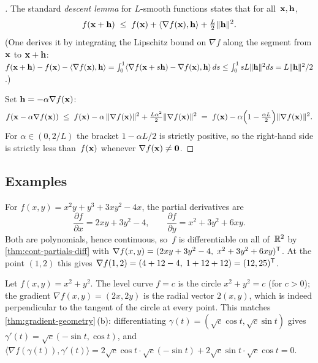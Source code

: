 \begin{proof}[]
The standard \emph{descent lemma} for $L$-smooth functions states
that for all~$\mathbf{x}, \mathbf{h}$,
\[
  f(\mathbf{x} + \mathbf{h}) \;\le\; f(\mathbf{x}) + \langle \nabla f(\mathbf{x}), \mathbf{h} \rangle + \tfrac{L}{2}\|\mathbf{h}\|^2.
\]
(One derives it by integrating the Lipschitz bound on $\nabla f$
along the segment from $\mathbf{x}$ to $\mathbf{x} + \mathbf{h}$:
$f(\mathbf{x} + \mathbf{h}) - f(\mathbf{x}) - \langle \nabla f(\mathbf{x}), \mathbf{h} \rangle = \int_0^1 \langle \nabla f(\mathbf{x} + s\mathbf{h}) - \nabla f(\mathbf{x}), \mathbf{h}\rangle\,ds \le \int_0^1 sL\|\mathbf{h}\|^2 ds = L\|\mathbf{h}\|^2/2$.)

Set $\mathbf{h} = -\alpha \nabla f(\mathbf{x})$:
\[
  f(\mathbf{x} - \alpha \nabla f(\mathbf{x}))
  \;\le\; f(\mathbf{x}) - \alpha\,\|\nabla f(\mathbf{x})\|^2 + \tfrac{L \alpha^2}{2}\|\nabla f(\mathbf{x})\|^2
  \;=\; f(\mathbf{x}) - \alpha\Bigl(1 - \tfrac{\alpha L}{2}\Bigr) \|\nabla f(\mathbf{x})\|^2.
\]
For $\alpha \in (0, 2/L)$ the bracket $1 - \alpha L / 2$ is strictly
positive, so the right-hand side is strictly less than~$f(\mathbf{x})$
whenever $\nabla f(\mathbf{x}) \neq \mathbf{0}$.
\end{proof}

\subsection*{Examples}

\begin{example}
\label{ex:gradient-compute}
For $f(x, y) = x^2 y + y^3 + 3 x y^2 - 4x$, the partial derivatives
are
\[
  \frac{\partial f}{\partial x} = 2 x y + 3 y^2 - 4, \qquad
  \frac{\partial f}{\partial y} = x^2 + 3 y^2 + 6 x y.
\]
Both are polynomials, hence continuous, so~$f$ is differentiable on
all of~$\mathbb{R}^2$ by \cref{thm:cont-partials-diff} with
$\nabla f(x, y) = (2xy + 3y^2 - 4,\; x^2 + 3y^2 + 6xy)^{\mathsf{T}}$. At the
point $(1, 2)$ this gives $\nabla f(1, 2) = (4 + 12 - 4,\; 1 + 12 + 12) = (12, 25)^{\mathsf{T}}$.
\end{example}

\begin{example}
\label{ex:gradient-orthogonal}
Let $f(x, y) = x^2 + y^2$. The level curve $f = c$ is the circle
$x^2 + y^2 = c$ (for $c > 0$); the gradient $\nabla f(x, y) = (2x, 2y)$
is the radial vector $2(x, y)$, which is indeed perpendicular to the
tangent of the circle at every point. This matches
\cref{thm:gradient-geometry}\,(b): differentiating
$\gamma(t) = (\sqrt{c}\cos t, \sqrt{c}\sin t)$ gives
$\gamma'(t) = \sqrt{c}(-\sin t, \cos t)$, and
$\langle \nabla f(\gamma(t)), \gamma'(t) \rangle = 2\sqrt{c}\cos t \cdot \sqrt{c}(-\sin t) + 2\sqrt{c}\sin t \cdot \sqrt{c}\cos t = 0$.
\end{example}

